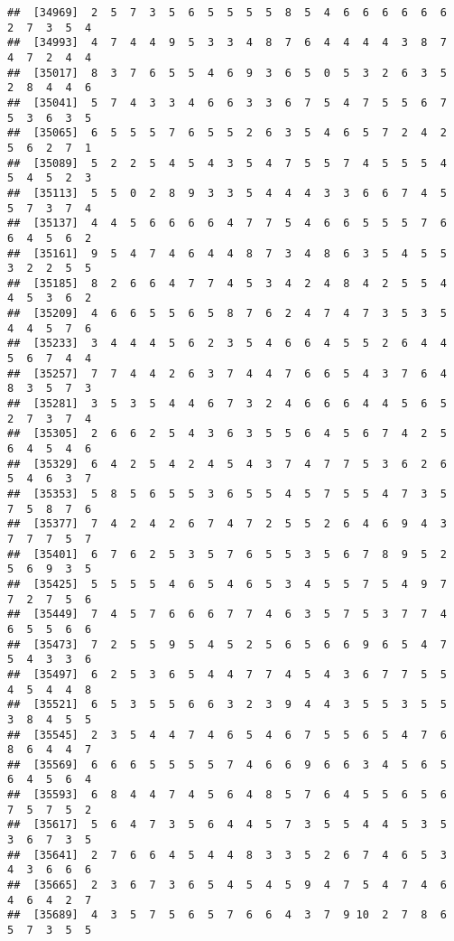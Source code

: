 \documentclass[
]{book}
\begin{document}
\begin{verbatim}
##  [34969]  2  5  7  3  5  6  5  5  5  5  8  5  4  6  6  6  6  6  6  2  7  3  5  4
##  [34993]  4  7  4  4  9  5  3  3  4  8  7  6  4  4  4  4  3  8  7  4  7  2  4  4
##  [35017]  8  3  7  6  5  5  4  6  9  3  6  5  0  5  3  2  6  3  5  2  8  4  4  6
##  [35041]  5  7  4  3  3  4  6  6  3  3  6  7  5  4  7  5  5  6  7  5  3  6  3  5
##  [35065]  6  5  5  5  7  6  5  5  2  6  3  5  4  6  5  7  2  4  2  5  6  2  7  1
##  [35089]  5  2  2  5  4  5  4  3  5  4  7  5  5  7  4  5  5  5  4  5  4  5  2  3
##  [35113]  5  5  0  2  8  9  3  3  5  4  4  4  3  3  6  6  7  4  5  5  7  3  7  4
##  [35137]  4  4  5  6  6  6  6  4  7  7  5  4  6  6  5  5  5  7  6  6  4  5  6  2
##  [35161]  9  5  4  7  4  6  4  4  8  7  3  4  8  6  3  5  4  5  5  3  2  2  5  5
##  [35185]  8  2  6  6  4  7  7  4  5  3  4  2  4  8  4  2  5  5  4  4  5  3  6  2
##  [35209]  4  6  6  5  5  6  5  8  7  6  2  4  7  4  7  3  5  3  5  4  4  5  7  6
##  [35233]  3  4  4  4  5  6  2  3  5  4  6  6  4  5  5  2  6  4  4  5  6  7  4  4
##  [35257]  7  7  4  4  2  6  3  7  4  4  7  6  6  5  4  3  7  6  4  8  3  5  7  3
##  [35281]  3  5  3  5  4  4  6  7  3  2  4  6  6  6  4  4  5  6  5  2  7  3  7  4
##  [35305]  2  6  6  2  5  4  3  6  3  5  5  6  4  5  6  7  4  2  5  6  4  5  4  6
##  [35329]  6  4  2  5  4  2  4  5  4  3  7  4  7  7  5  3  6  2  6  5  4  6  3  7
##  [35353]  5  8  5  6  5  5  3  6  5  5  4  5  7  5  5  4  7  3  5  7  5  8  7  6
##  [35377]  7  4  2  4  2  6  7  4  7  2  5  5  2  6  4  6  9  4  3  7  7  7  5  7
##  [35401]  6  7  6  2  5  3  5  7  6  5  5  3  5  6  7  8  9  5  2  5  6  9  3  5
##  [35425]  5  5  5  5  4  6  5  4  6  5  3  4  5  5  7  5  4  9  7  7  2  7  5  6
##  [35449]  7  4  5  7  6  6  6  7  7  4  6  3  5  7  5  3  7  7  4  6  5  5  6  6
##  [35473]  7  2  5  5  9  5  4  5  2  5  6  5  6  6  9  6  5  4  7  5  4  3  3  6
##  [35497]  6  2  5  3  6  5  4  4  7  7  4  5  4  3  6  7  7  5  5  4  5  4  4  8
##  [35521]  6  5  3  5  5  6  6  3  2  3  9  4  4  3  5  5  3  5  5  3  8  4  5  5
##  [35545]  2  3  5  4  4  7  4  6  5  4  6  7  5  5  6  5  4  7  6  8  6  4  4  7
##  [35569]  6  6  6  5  5  5  5  7  4  6  6  9  6  6  3  4  5  6  5  6  4  5  6  4
##  [35593]  6  8  4  4  7  4  5  6  4  8  5  7  6  4  5  5  6  5  6  7  5  7  5  2
##  [35617]  5  6  4  7  3  5  6  4  4  5  7  3  5  5  4  4  5  3  5  3  6  7  3  5
##  [35641]  2  7  6  6  4  5  4  4  8  3  3  5  2  6  7  4  6  5  3  4  3  6  6  6
##  [35665]  2  3  6  7  3  6  5  4  5  4  5  9  4  7  5  4  7  4  6  4  6  4  2  7
##  [35689]  4  3  5  7  5  6  5  7  6  6  4  3  7  9 10  2  7  8  6  5  7  3  5  5

\end{verbatim}
\end{document}
